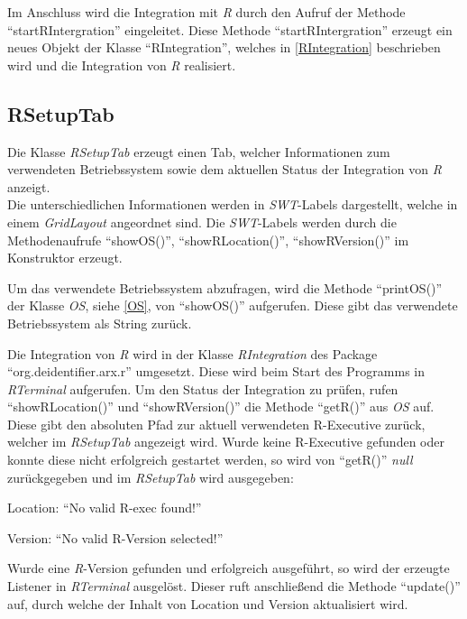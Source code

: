 \documentclass[a4paper, 12pt]{report} %
\begin{document}
Im Anschluss wird die Integration mit \textit{R} durch den Aufruf der Methode "`startRIntergration"' eingeleitet.
Diese Methode "`startRIntergration"' erzeugt ein neues Objekt der Klasse "`RIntegration"', welches in \ref{RIntegration} beschrieben wird und die Integration von \textit{R} realisiert.


\subsection{RSetupTab}

Die Klasse \textit{RSetupTab} erzeugt einen Tab, welcher Informationen zum verwendeten Betriebssystem sowie dem aktuellen Status der Integration von \textit{R} anzeigt.\\

Die unterschiedlichen Informationen werden in \textit{SWT}-Labels dargestellt, welche in einem \textit{GridLayout} angeordnet sind.
Die \textit{SWT}-Labels werden durch die Methodenaufrufe "`showOS()"', "`showRLocation()"', "`showRVersion()"' im Konstruktor erzeugt.

Um das verwendete Betriebssystem abzufragen, wird die Methode "`printOS()"' der Klasse \textit{OS}, siehe \ref{OS}, von "`showOS()"' aufgerufen. Diese gibt das verwendete Betriebssystem als String zurück.


Die Integration von \textit{R} wird in der Klasse \textit{RIntegration} des  Package "`org.deidentifier.arx.r"' umgesetzt. Diese wird beim Start des Programms in \textit{RTerminal} aufgerufen. 
 Um den Status der Integration zu prüfen, rufen "`showRLocation()"' und "`showRVersion()"' die Methode "`getR()"' aus \textit{OS} auf. Diese gibt den absoluten Pfad zur aktuell verwendeten R-Executive zurück, welcher im \textit{RSetupTab} angezeigt wird.
Wurde keine R-Executive gefunden oder konnte diese nicht erfolgreich gestartet werden, so wird von "`getR()"' \textit{null} zurückgegeben und im \textit{RSetupTab} wird ausgegeben:  
\begin{center}
Location: "`No valid R-exec found!"'

Version: "`No valid R-Version selected!"'
\end{center}
Wurde eine \textit{R}-Version gefunden und erfolgreich ausgeführt, so wird der erzeugte Listener in \textit{RTerminal} ausgelöst. Dieser ruft anschließend die Methode "`update()"' auf, durch welche der Inhalt von Location und Version aktualisiert wird.\\
\end{document}
